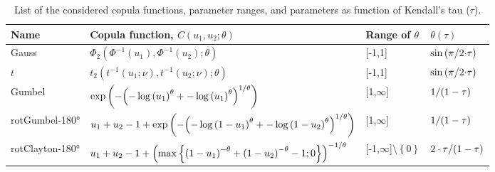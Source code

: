 \begin{table}
\caption{List of the considered copula functions, parameter ranges, and parameters as function of Kendall's tau ($\tau$).}
\centering
\label{tab:copula}
\small
	\begin{threeparttable}
    \begin{tabular}{llll}
    \toprule
    Name  & Copula function, $C(u_1,u_2;\theta)$ & Range of $\theta$ & $\theta(\tau)$ \\
    \midrule
    \rowcolor{lightgrey} Gauss  & ${\Phi _2}\left( {{\Phi ^{ - 1}}({u_1}),{\Phi ^{ - 1}}({u_2});\theta } \right)$ & [-1,1] & $\sin \left( {{\pi  \mathord{\left/
     {\vphantom {\pi  {2 \cdot }}} \right.
     \kern-\nulldelimiterspace} {2 \cdot }}\tau } \right)$  \\
     
     $t$  & ${t_2}\left( {{t^{ - 1}}({u_1};\nu ),{t^{ - 1}}({u_2};\nu );\theta } \right)$ & [-1,1] & $\sin \left( {{\pi  \mathord{\left/
          {\vphantom {\pi  {2 \cdot }}} \right.
          \kern-\nulldelimiterspace} {2 \cdot }}\tau } \right)$  \\
           
     \rowcolor{lightgrey} Gumbel  & $\exp \left( { - {{\left( { - \log {{({u_1})}^\theta } +  - \log {{({u_1})}^\theta }} \right)}^{{1 \mathord{\left/
       {\vphantom {1 \theta }} \right.
       \kern-\nulldelimiterspace} \theta }}}} \right)$ & [1,$\infty$] & ${1 \mathord{\left/
        {\vphantom {1 {\left( {1 - \tau } \right)}}} \right.
        \kern-\nulldelimiterspace} {\left( {1 - \tau } \right)}}$  \\ 
           
     rotGumbel-180°  & ${u_1} + {u_2} - 1 + \exp \left( { - {{\left( { - \log {{(1 - {u_1})}^\theta } +  - \log {{(1 - {u_2})}^\theta }} \right)}^{{1 \mathord{\left/
      {\vphantom {1 \theta }} \right.
      \kern-\nulldelimiterspace} \theta }}}} \right)$ & [1,$\infty$] & ${1 \mathord{\left/
              {\vphantom {1 {\left( {1 - \tau } \right)}}} \right.
              \kern-\nulldelimiterspace} {\left( {1 - \tau } \right)}}$  \\
    
     \rowcolor{lightgrey} rotClayton-180°  & ${u_1} + {u_2} - 1 + {\left( {\max \left\{ {{{\left( {1 - {u_1}} \right)}^{ - \theta }} + {{\left( {1 - {u_2}} \right)}^{ - \theta }} - 1;0} \right\}} \right)^{{{ - 1} \mathord{\left/
      {\vphantom {{ - 1} \theta }} \right.
      \kern-\nulldelimiterspace} \theta }}}$ & [-1,$\infty$]$\setminus \left\{ 0 \right\}$ & ${{2 \cdot \tau } \mathord{\left/
       {\vphantom {{2 \cdot \tau } {\left( {1 - \tau } \right)}}} \right.
       \kern-\nulldelimiterspace} {\left( {1 - \tau } \right)}}$  \\           
     

\end{tabular}
\end{threeparttable}
\end{table}
